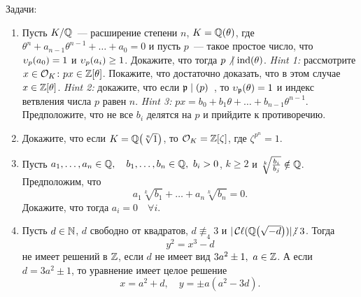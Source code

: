 	\begin{homework}\label{hw_7}
		Задачи:
		\begin{enumerate}
			\item Пусть $K/\mathbb{Q}$~--- расширение степени $n$, $K = \mathbb{Q}(\theta)$, где $\theta^n + a_{n - 1}\theta^{n - 1} + \ldots + a_0 = 0$ и пусть $p$~--- такое простое число, что $\upsilon_{p}(a_0) = 1$ и $\upsilon_{p}(a_i) \ge 1$. Докажите, что тогда $p \not \ \mid \operatorname{ind}(\theta)$.
			\emph{Hint 1:} рассмотрите $x \in \mathcal{O}_{K}\colon px \in \mathbb{Z}[\theta]$. Покажите, что достаточно доказать, что в этом случае $x \in \mathbb{Z}[\theta]$. \emph{Hint 2:} докажите, что если $\mathfrak{p} \mid (p)$~, то $\upsilon_{\mathfrak{p}}(\theta) = 1$ и индекс ветвления числа $p$ равен $n$. \emph{Hint 3:} $px = b_0 + b_1 \theta + \ldots + b_{n - 1}\theta^{n - 1}$. Предположите, что не все $b_i$ делятся на $p$ и прийдите к противоречию. 

			\item Докажите, что если $K = \Q\lr*{\sqrt[n]{1}}$, то $\mathcal{O}_{K} = \mathbb{Z}[\zeta]$, где  $\zeta^{p^n} = 1$. 

			\item  Пусть $a_1, \ldots, a_n \in \mathbb{Q}, \quad b_1, \ldots, b_n \in \mathbb{Q}, \ b_i > 0$, $k \ge 2$ и $\sqrt[k]{\frac{b_i}{b_j}} \notin \mathbb{Q}$. Предположим, что 
			\[
				a_1 \sqrt[k]{b_1} + \ldots + a_n \sqrt[k]{b_n} = 0.
			\]
			Докажите, что тогда $a_i = 0 \quad \forall i$. 
			\item \begin{theorem}[Баше] 
				Пусть $d \in \mathbb{N}$, $d$ свободно от квадратов, $d \not\equiv_{4} 3$ и $|\Class(\Q\lr*{\sqrt{-d}})| \notdivby 3$. Тогда 
				\[
					y^2 = x^3 - d
				\]
				не имеет решений в $\mathbb{Z}$, если $d$ не имеет вид $3 a^2 \pm 1, \ a \in \mathbb{Z}$. А если $d = 3a^2 \pm 1$, то  уравнение имеет целое решение 
				\[
					x = a^2 + d, \quad y = \pm a (a^2 - 3d).
				\]
			\end{theorem}

		\end{enumerate}
	\end{homework}

	




